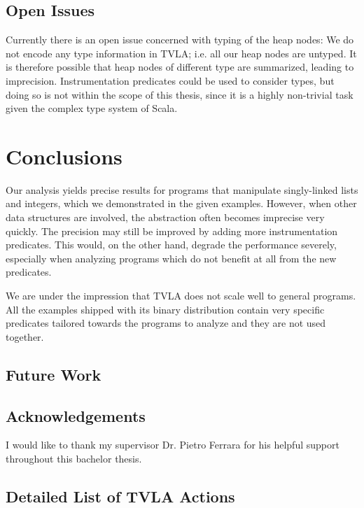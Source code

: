 \documentclass[11pt,a4paper,english]{article}
\begin{document}
\FloatBarrier

\subsection{Open Issues} 
Currently there is an open issue concerned with typing of the heap nodes: We do
not encode any type information in TVLA; i.e. all our heap nodes are untyped. It
is therefore possible that heap nodes of different type are summarized, leading
to imprecision. Instrumentation predicates could be used to consider types, but
doing so is not within the scope of this thesis, since it is a highly
non-trivial task given the complex type system of Scala.


\clearpage
\newpage
\section{Conclusions}
Our analysis yields precise results for programs that manipulate
singly-linked lists and integers, which we demonstrated in the given examples.
However, when other data structures are involved, the abstraction often becomes
imprecise very quickly. The precision may still be improved by adding more
instrumentation predicates. This would, on the other hand, degrade the
performance severely, especially when analyzing programs which do not benefit at
all from the new predicates.

We are under the impression that TVLA does not scale well to general programs.
All the examples shipped with its binary distribution contain very specific
predicates tailored towards the programs to analyze and they are not used
together.

\subsection{Future Work}

\subsection{Acknowledgements} 
I would like to thank my supervisor Dr. Pietro Ferrara for his helpful support
throughout this bachelor thesis.



\clearpage
\newpage






\clearpage
\newpage
\begin{appendix}
\section{Detailed List of TVLA Actions}


%

\end{appendix}
\end{document}
